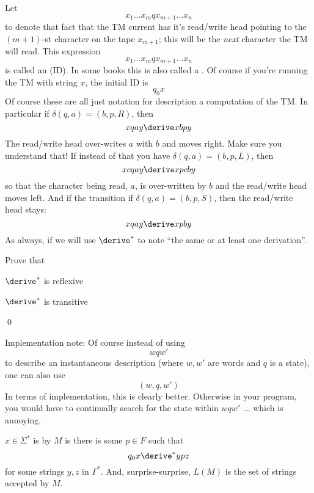 \begin{defn}
Let
\[
 x_1 \ldots x_m q x_{m+1} \ldots x_n
\]
to denote that fact that the TM current has it's read/write head
pointing to the $(m+1)$-st character on the tape $x_{m+1}$; this
will be the \textit{next} character the TM will read. This expression
\[
 x_1 \ldots x_m q x_{m+1} \ldots x_n
\]
is called
an  (ID). In some books this is
also called a . Of course if you're running
the TM with string $x$, the initial ID is
\[
q_0 x
\]
Of course these are all just notation for description a computation
of the TM. In particular if $\delta(q,a) = (b,p,R)$, then
\[
 x q a y \derive xb p y
\]
The read/write head over-writes $a$ with $b$ and moves right. Make
sure you understand that! If instead of that you have $\delta(q,a) =
(b,p,L)$, then
\[
 x c q a y \derive x p c b y
\]
so that the character being read, $a$, is over-written by $b$ and
the read/write head moves left. And if the transition if
$\delta(q,a) = (b,p,S)$, then the read/write head stays:
\[
 x q a y \derive x p b y
\]
As always, if we will use $\derive^*$ to note ``the same or at
least one derivation''.
\end{defn}

\begin{ex}
Prove that
\begin{tightlist}
  \item $\derive^*$ is reflexive
  \item $\derive^*$ is transitive
\end{tightlist}
\qed
\end{ex}

\begin{ex}
  Implementation note:
  Of course instead of using
\[
 w q w'
\]
to describe an instantaneous description
(where $w,w'$ are words and $q$ is a state),
one can also use
\[
 (w, q, w')
\]
In terms of implementation, this is clearly better.
Otherwise in your program, you would have to continually search for
the state within $wqw'$ ... which is annoying.
\end{ex}
 
\begin{defn}
$x \in \Sigma^*$ is  by $M$ is there is some $p
\in F$ such that
\[
 q_0 x \derive^* ypz
\]
for some strings $y,z$ in $\Gamma^*$. And, surprise-surprise, $L(M)$
is the set of strings accepted by $M$.
\end{defn}



